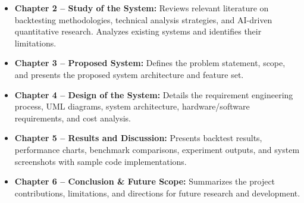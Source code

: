 \begin{itemize}
    \item \textbf{Chapter 2 -- Study of the System:} Reviews relevant literature on backtesting methodologies, technical analysis strategies, and AI-driven quantitative research. Analyzes existing systems and identifies their limitations.
    
    \item \textbf{Chapter 3 -- Proposed System:} Defines the problem statement, scope, and presents the proposed system architecture and feature set.
    
    \item \textbf{Chapter 4 -- Design of the System:} Details the requirement engineering process, UML diagrams, system architecture, hardware/software requirements, and cost analysis.
    
    \item \textbf{Chapter 5 -- Results and Discussion:} Presents backtest results, performance charts, benchmark comparisons, experiment outputs, and system screenshots with sample code implementations.
    
    \item \textbf{Chapter 6 -- Conclusion \& Future Scope:} Summarizes the project contributions, limitations, and directions for future research and development.
\end{itemize}



